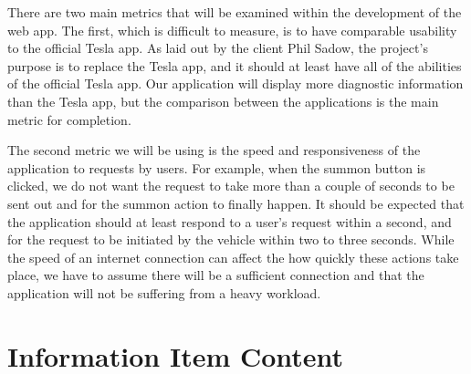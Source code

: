 \documentclass[onecolumn, draftclsnofoot,10pt, compsoc]{IEEEtran}
\begin{document}
    There are two main metrics that will be examined within the development of the web app. 
    The first, which is difficult to measure, is to have comparable usability to the official Tesla app.
    As laid out by the client Phil Sadow, the project's purpose is to replace the Tesla app, and it should at least have all of the abilities of the official Tesla app.
    Our application will display more diagnostic information than the Tesla app, but the comparison between the applications is the main metric for completion.
    
    The second metric we will be using is the speed and responsiveness of the application to requests by users.
    For example, when the summon button is clicked, we do not want the request to take more than a couple of seconds to be sent out and for the summon action to finally happen.
    It should be expected that the application should at least respond to a user's request within a second, and for the request to be initiated by the vehicle within two to three seconds.
    While the speed of an internet connection can affect the how quickly these actions take place, we have to assume there will be a sufficient connection and that the application will not be suffering from a heavy workload.

\section{Information Item Content} %


\end{document}
